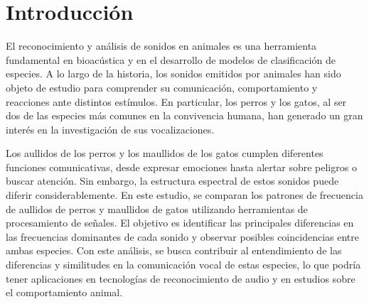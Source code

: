 \documentclass[journal]{IEEEtran}
\begin{document}



\section{Introducción}
% 
% 
% 
% 
\IEEEPARstart
{E}{l} reconocimiento y análisis de sonidos en animales es una herramienta fundamental en bioacústica y en el desarrollo de modelos de clasificación de especies. A lo largo de la historia, los sonidos emitidos por animales han sido objeto de estudio para comprender su comunicación, comportamiento y reacciones ante distintos estímulos. En particular, los perros y los gatos, al ser dos de las especies más comunes en la convivencia humana, han generado un gran interés en la investigación de sus vocalizaciones.

Los aullidos de los perros y los maullidos de los gatos cumplen diferentes funciones comunicativas, desde expresar emociones hasta alertar sobre peligros o buscar atención. Sin embargo, la estructura espectral de estos sonidos puede diferir considerablemente. En este estudio, se comparan los patrones de frecuencia de aullidos de perros y maullidos de gatos utilizando herramientas de procesamiento de señales. El objetivo es identificar las principales diferencias en las frecuencias dominantes de cada sonido y observar posibles coincidencias entre ambas especies. Con este análisis, se busca contribuir al entendimiento de las diferencias y similitudes en la comunicación vocal de estas especies, lo que podría tener aplicaciones en tecnologías de reconocimiento de audio y en estudios sobre el comportamiento animal.
\end{document}
